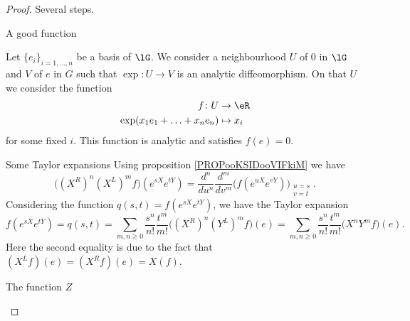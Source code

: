 \begin{proof}
    Several steps.
    \begin{subproof}
        \item[A good function]
        
            Let \( \{ e_i \}_{i=1,\ldots, n}\) be a basis of \( \lG\). We consider a neighbourhood \( U\) of \( 0\) in \( \lG\) and \( V\) of \( e\) in \( G\) such that \( \exp\colon U\to V\) is an analytic diffeomorphism. On that \( U\) we consider the function
            \begin{equation}
                \begin{aligned}
                    f\colon U&\to \eR \\
                    \exp(x_1e_1+\ldots +x_ne_n)&\mapsto x_i 
                \end{aligned}
            \end{equation}
            for some fixed \( i\). This function is analytic and satisfies \( f(e)=0\). 
        \item[Some Taylor expansions] 
            Using proposition \ref{PROPooKSIDooVIFkiM} we have
            \begin{equation}
                \big( (X^R)^n(X^L)^mf \big)( e^{sX} e^{tY})=\frac{ d^n }{ du^n }\frac{ d^m }{ dv^m }\big( f( e^{uX} e^{vY}) \big)_{\substack{u=s\\v=t}}.
            \end{equation}
            Considering the function \( q(s,t)=f( e^{sX} e^{tY})\), we have the Taylor expansion
            \begin{equation}        \label{EQooNBOIooRxlZmP}
                f( e^{sX} e^{tY})=q(s,t)=\sum_{m,n\geq 0}\frac{ s^n }{ n! }\frac{ t^m }{ m! }\big( (X^R)^n(Y^L)^mf \big)(e)=\sum_{m,n\geq 0}\frac{ s^n }{ n! }\frac{ t^m }{ m! }\big( X^nY^mf \big)(e).
            \end{equation}
            Here the second equality is due to the fact that \( (X^Lf)(e)=(X^Rf)(e)=X(f)\).

        \item[The function \( Z\)]


\end{subproof}
\end{proof}

